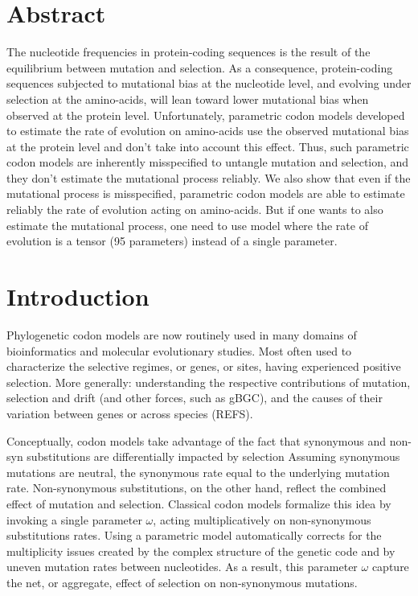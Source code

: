 \section{Abstract}

The nucleotide frequencies in protein-coding sequences is the result of the equilibrium between mutation and selection.
As a consequence, protein-coding sequences subjected to mutational bias at the nucleotide level, and evolving under selection at the amino-acids, will lean toward lower mutational bias when observed at the protein level.
Unfortunately, parametric \gls{codon} models developed to estimate the rate of evolution on amino-acids use the observed mutational bias at the protein level and don't take into account this effect.
Thus, such parametric \gls{codon} models are inherently misspecified to untangle mutation and selection, and they don’t estimate the mutational process reliably.
We also show that even if the mutational process is misspecified, parametric \gls{codon} models are able to estimate reliably the rate of evolution acting on amino-acids.
But if one wants to also estimate the mutational process, one need to use model where the rate of evolution is a tensor (95 parameters) instead of a single parameter.


\section{Introduction}

Phylogenetic codon models are now routinely used in many domains of bioinformatics and molecular evolutionary studies.
Most often used to characterize the selective regimes, or genes, or sites, having experienced positive selection.
More generally: understanding the respective contributions of mutation, selection and drift (and other forces, such as gBGC), and the causes of their variation between genes or across species (REFS).

Conceptually, codon models take advantage of the fact that synonymous and non-syn substitutions are differentially impacted by selection
Assuming synonymous mutations are neutral, the synonymous rate equal to the underlying mutation rate.
Non-synonymous substitutions, on the other hand, reflect the combined effect of mutation and selection.
Classical codon models formalize this idea by invoking a single parameter $\omega$, acting multiplicatively on non-synonymous substitutions rates.
Using a parametric model automatically corrects for the multiplicity issues created by the complex structure of the genetic code and by uneven mutation rates between nucleotides.
As a result, this parameter $\omega$ capture the net, or aggregate, effect of selection on non-synonymous mutations.

